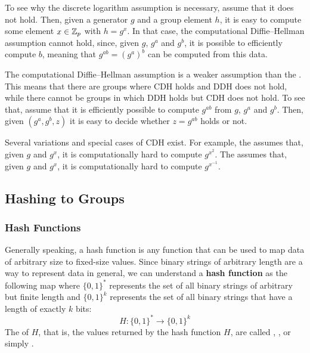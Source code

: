To see why the discrete logarithm assumption is necessary, assume that it does not hold. Then, given a generator $g$ and a group element $h$, it is easy to compute some element $x\in\mathbb{Z}_p$ with $h=g^x$. In that case, the computational Diffie--Hellman assumption cannot hold, since, given $g$, $g^a$ and $g^b$, it is possible to efficiently compute $b$, meaning that $g^{ab}=(g^a)^b$ can be computed from this data.

The computational Diffie--Hellman assumption is a weaker assumption than the . This means that there are groups where CDH holds and DDH does not hold, while there cannot be groups in which DDH holds but CDH does not hold. To see that, assume that it is efficiently possible to compute $g^{ab}$ from $g$, $g^a$ and $g^b$. Then, given $(g^a,g^b,z)$ it is easy to decide whether $z=g^{ab}$ holds or not.

Several variations and special cases of CDH exist. For example, the  assumes that, given $g$ and $g^x$, it is computationally hard to compute $g^{x^2}$. The  assumes that, given $g$ and $g^x$, it is computationally hard to compute $g^{x^{-1}}$.

\subsection{Hashing to Groups}\label{sec:hashing-to-groups}
\subsubsection{Hash Functions}\label{sec:hash-functions} Generally speaking, a hash function is any function that can be used to map data of arbitrary size to fixed-size values. Since binary strings of arbitrary length are a way to represent data in general, we can understand a \textbf{hash function} as the following map where $\{0,1\}^*$ represents the set of all binary strings of arbitrary but finite length and $\{0,1\}^k$ represents the set of all binary strings that have a length of exactly $k$ bits:
\begin{equation}
\label{def:hash_function}
H: \{0,1\}^* \to \{0,1\}^k
\end{equation}
The  of $H$, that is, the values returned by the hash function $H$, are called , , or simply .

